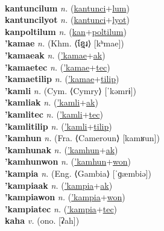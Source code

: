  \label{kantuncilon} \\
\textbf{kantuncilum} \textit{n.} (\hyperref[kantunci]{kantunci}+\hyperref[lum]{lum})
 \label{kantuncilum} \\
\textbf{kantuncilyot} \textit{n.} (\hyperref[kantunci]{kantunci}+\hyperref[lyot]{lyot})
 \label{kantuncilyot} \\
\textbf{kanpoltilum} \textit{n.} (\hyperref[kan]{kan}+\hyperref[poltilum]{poltilum})
 \label{kanpoltilum} \\
\textbf{'kamae} \textit{n.} (Khm. ⟨ខ្មែរ⟩ [kʰmae])
 \label{'kamae} \\
\textbf{'kamaeak} \textit{n.} (\hyperref['kamae]{'kamae}+\hyperref[ak]{ak})
 \label{'kamaeak} \\
\textbf{'kamaetec} \textit{n.} (\hyperref['kamae]{'kamae}+\hyperref[tec]{tec})
 \label{'kamaetec} \\
\textbf{'kamaetilip} \textit{n.} (\hyperref['kamae]{'kamae}+\hyperref[tilip]{tilip})
 \label{'kamaetilip} \\
\textbf{'kamli} \textit{n.} (Cym. ⟨Cymry⟩ [ˈkəmrɨ])
 \label{'kamli} \\
\textbf{'kamliak} \textit{n.} (\hyperref['kamli]{'kamli}+\hyperref[ak]{ak})
 \label{'kamliak} \\
\textbf{'kamlitec} \textit{n.} (\hyperref['kamli]{'kamli}+\hyperref[tec]{tec})
 \label{'kamlitec} \\
\textbf{'kamlitilip} \textit{n.} (\hyperref['kamli]{'kamli}+\hyperref[tilip]{tilip})
 \label{'kamlitilip} \\
\textbf{'kamhun} \textit{n.} (Fra. ⟨Cameroun⟩ [kamʁun])
 \label{'kamhun} \\
\textbf{'kamhunak} \textit{n.} (\hyperref['kamhun]{'kamhun}+\hyperref[ak]{ak})
 \label{'kamhunak} \\
\textbf{'kamhunwon} \textit{n.} (\hyperref['kamhun]{'kamhun}+\hyperref[won]{won})
 \label{'kamhunwon} \\
\textbf{'kampia} \textit{n.} (Eng. ⟨Gambia⟩ [ˈɡæmbiə])
 \label{'kampia} \\
\textbf{'kampiaak} \textit{n.} (\hyperref['kampia]{'kampia}+\hyperref[ak]{ak})
 \label{'kampiaak} \\
\textbf{'kampiawon} \textit{n.} (\hyperref['kampia]{'kampia}+\hyperref[won]{won})
 \label{'kampiawon} \\
\textbf{'kampiatec} \textit{n.} (\hyperref['kampia]{'kampia}+\hyperref[tec]{tec})
 \label{'kampiatec} \\
\textbf{kaha} \textit{v.} (ono. [ʡah])
 \label{kaha} \\
